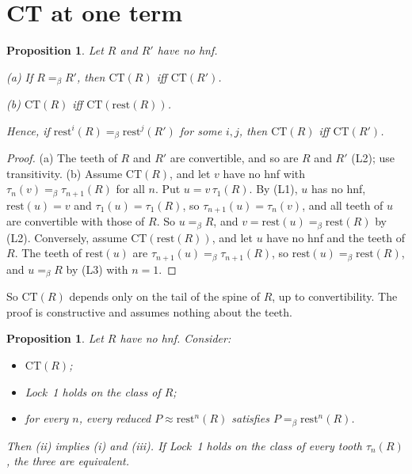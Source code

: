 \documentclass[11pt]{amsart}
\newtheorem{proposition}[theorem]{Proposition}
\theoremstyle{definition}
\newcommand{\conv}{=_\beta}
\newcommand{\rest}{\mathrm{rest}}
\newcommand{\CT}{\mathrm{CT}}
\begin{document}
\section{CT at one term}\label{sec:ct}

\begin{proposition}\label{prop:shift}
Let $R$ and $R'$ have no hnf.

\textup{(a)} If $R\conv R'$, then $\CT(R)$ iff $\CT(R')$.

\textup{(b)} $\CT(R)$ iff $\CT(\rest(R))$.

Hence, if $\rest^i(R)\conv\rest^j(R')$ for some $i,j$, then $\CT(R)$ iff $\CT(R')$.
\end{proposition}

\begin{proof}
(a) The teeth of $R$ and $R'$ are convertible, and so are $R$ and $R'$ (L2); use transitivity.
(b) Assume $\CT(R)$, and let $v$ have no hnf with $\tau_n(v)\conv\tau_{n+1}(R)$ for all $n$. Put
$u=v\,\tau_1(R)$. By (L1), $u$ has no hnf, $\rest(u)=v$ and $\tau_1(u)=\tau_1(R)$, so
$\tau_{n+1}(u)=\tau_n(v)$, and all teeth of $u$ are convertible with those of $R$. So $u\conv R$, and
$v=\rest(u)\conv\rest(R)$ by (L2). Conversely, assume $\CT(\rest(R))$, and let $u$ have no hnf and the
teeth of $R$. The teeth of $\rest(u)$ are $\tau_{n+1}(u)\conv\tau_{n+1}(R)$, so $\rest(u)\conv\rest(R)$,
and $u\conv R$ by (L3) with $n=1$.
\end{proof}

So $\CT(R)$ depends only on the tail of the spine of $R$, up to convertibility. The proof is
constructive and assumes nothing about the teeth.

\begin{proposition}\label{prop:bot}
Let $R$ have no hnf. Consider:
\begin{itemize}
\item[(i)] $\CT(R)$;
\item[(ii)] Lock~1 holds on the class of $R$;
\item[(iii)] for every $n$, every reduced $P\approx\rest^n(R)$ satisfies $P\conv\rest^n(R)$.
\end{itemize}
Then \textup{(ii)} implies \textup{(i)} and \textup{(iii)}. If Lock~1 holds on the class of every
tooth $\tau_n(R)$, the three are equivalent.
\end{proposition}
\end{document}
